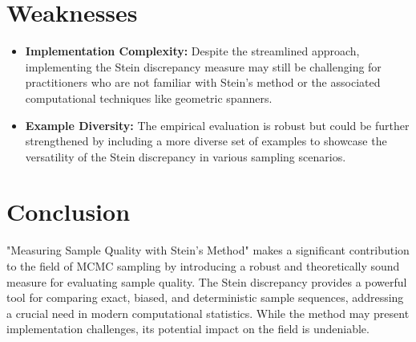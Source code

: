 \documentclass{article}
\begin{document}
	\section*{Weaknesses}
	\begin{itemize}
		\item \textbf{Implementation Complexity:} Despite the streamlined approach, implementing the Stein discrepancy measure may still be challenging for practitioners who are not familiar with Stein’s method or the associated computational techniques like geometric spanners.
		\item \textbf{Example Diversity:} The empirical evaluation is robust but could be further strengthened by including a more diverse set of examples to showcase the versatility of the Stein discrepancy in various sampling scenarios.
	\end{itemize}
	
	\section*{Conclusion}
	"Measuring Sample Quality with Stein’s Method" makes a significant contribution to the field of MCMC sampling by introducing a robust and theoretically sound measure for evaluating sample quality. The Stein discrepancy provides a powerful tool for comparing exact, biased, and deterministic sample sequences, addressing a crucial need in modern computational statistics. While the method may present implementation challenges, its potential impact on the field is undeniable.
	
\end{document}
